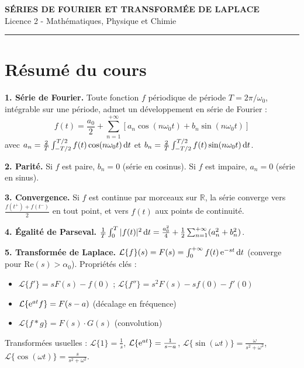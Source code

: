 \documentclass[12pt,a4paper]{article}
\begin{document}
\fi

\begin{center}
  {\LARGE\bfseries SÉRIES DE FOURIER ET TRANSFORMÉE DE LAPLACE}\\[0.3cm]
  {\normalsize Licence 2 - Mathématiques, Physique et Chimie}\\[0.1cm]
  \rule{0.7\textwidth}{0.8pt}
\end{center}

\section*{Résumé du cours}

\begin{boiteresume}

\textbf{1. Série de Fourier.} Toute fonction $f$ périodique de période $T=2\pi/\omega_0$, intégrable sur une période, admet un développement en série de Fourier :
\[
f(t) = \frac{a_0}{2} + \sum_{n=1}^{+\infty}\left[a_n\cos(n\omega_0 t) + b_n\sin(n\omega_0 t)\right]
\]
avec $a_n = \frac{2}{T}\int_{-T/2}^{T/2} f(t)\cos(n\omega_0 t)\,\mathrm{d} t$ et $b_n = \frac{2}{T}\int_{-T/2}^{T/2} f(t)\sin(n\omega_0 t)\,\mathrm{d} t$.

\textbf{2. Parité.} Si $f$ est paire, $b_n=0$ (série en cosinus). Si $f$ est impaire, $a_n=0$ (série en sinus).

\textbf{3. Convergence.} Si $f$ est continue par morceaux sur $\mathbb{R}$, la série converge vers $\frac{f(t^+)+f(t^-)}{2}$ en tout point, et vers $f(t)$ aux points de continuité.

\textbf{4. Égalité de Parseval.} $\frac{1}{T}\int_0^T |f(t)|^2\,\mathrm{d} t = \frac{a_0^2}{4}+\frac{1}{2}\sum_{n=1}^{+\infty}(a_n^2+b_n^2)$.

\textbf{5. Transformée de Laplace.} $\mathcal{L}\{f\}(s) = F(s) = \int_0^{+\infty} f(t)\,\mathrm{e}^{-st}\,\mathrm{d} t$ (converge pour $\text{Re}(s)>\alpha_0$). Propriétés clés :
\begin{itemize}[nosep]
  \item $\mathcal{L}\{f'\} = sF(s)-f(0)$ ; $\mathcal{L}\{f''\} = s^2F(s)-sf(0)-f'(0)$
  \item $\mathcal{L}\{\mathrm{e}^{at}f\} = F(s-a)$ (décalage en fréquence)
  \item $\mathcal{L}\{f*g\} = F(s)\cdot G(s)$ (convolution)
\end{itemize}
Transformées usuelles : $\mathcal{L}\{1\}=\frac{1}{s}$, $\mathcal{L}\{\mathrm{e}^{at}\}=\frac{1}{s-a}$, $\mathcal{L}\{\sin(\omega t)\}=\frac{\omega}{s^2+\omega^2}$, $\mathcal{L}\{\cos(\omega t)\}=\frac{s}{s^2+\omega^2}$.

\end{boiteresume}
\end{document}
